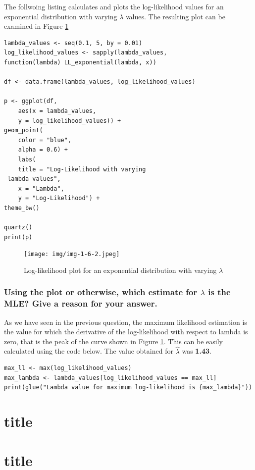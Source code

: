 \documentclass[]{article}
\begin{document}
The follwoing listing calculates and plots the log-likelihood values for an exponential distribution with varying $\lambda$ values. The resulting plot can be examined in Figure \ref{fig:img-1-6-2}


\begin{lstlisting}
lambda_values <- seq(0.1, 5, by = 0.01)
log_likelihood_values <- sapply(lambda_values,
function(lambda) LL_exponential(lambda, x))

df <- data.frame(lambda_values, log_likelihood_values)

p <- ggplot(df, 
	aes(x = lambda_values, 
	y = log_likelihood_values)) +
geom_point(
	color = "blue",
	alpha = 0.6) +
	labs(
	title = "Log-Likelihood with varying
 lambda values",
	x = "Lambda",
	y = "Log-Likelihood") +
theme_bw()

quartz()
print(p)
\end{lstlisting}

\begin{figure}[H]
	\centering
	\texttt{[image: img/img-1-6-2.jpeg]}
	\caption{Log-likelihood plot for an exponential distribution with varying $\lambda$}
	\label{fig:img-1-6-2}
\end{figure}


\subsubsection{Using the plot or otherwise, which estimate for $\lambda$ is the MLE? Give a reason for your answer.}

As we have seen in the previous question, the maximum likelihood estimation is the value for which the derivative of the log-likelihood with respect to lambda is zero, that is the peak of the curve shown in Figure \ref*{fig:img-1-6-2}. This can be easily calculated using the code below. The value obtained for $\hat{\lambda}$ was \textbf{1.43}.

\begin{lstlisting}
max_ll <- max(log_likelihood_values)
max_lambda <- lambda_values[log_likelihood_values == max_ll]
print(glue("Lambda value for maximum log-likelihood is {max_lambda}"))
\end{lstlisting}



\section{title}

\section{title}
\end{document}
